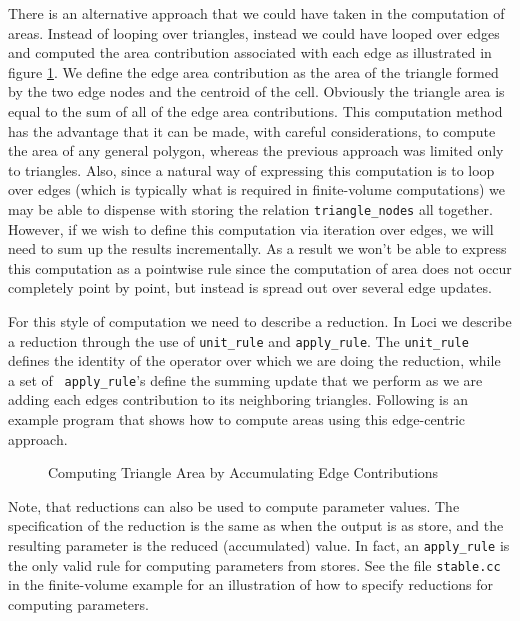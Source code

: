 \documentclass[10pt,epsf]{book}
\begin{document}
There is an alternative approach that we could have taken in the
computation of areas.  Instead of looping over triangles, instead we
could have looped over edges and computed the area contribution
associated with each edge as illustrated in figure \ref{fig:area}.  We
define the edge area contribution as the area of the triangle formed
by the two edge nodes and the centroid of the cell.  Obviously the
triangle area is equal to the sum of all of the edge area
contributions.  This computation method has the advantage that it can
be made, with careful considerations, to compute the area of any
general polygon, whereas the previous approach was limited only to
triangles.  Also, since a natural way of expressing this computation
is to loop over edges (which is typically what is required in
finite-volume computations) we may be able to dispense with storing
the relation {\tt triangle\_nodes} all together.  However, if we wish
to define this computation via iteration over edges, we will need to
sum up the results incrementally.  As a result we won't be able to
express this computation as a pointwise rule since the computation
of area does not occur completely point by point, but instead is
spread out over several edge updates.  

For this style of computation we need to describe a reduction.  In
Loci we describe a reduction through the use of {\tt unit\_rule} and
{\tt apply\_rule}.  The {\tt unit\_rule} defines the identity of the
operator over which we are doing the reduction, while a set of {\tt
  apply\_rule}'s define the summing update that we perform as we are
adding each edges contribution to its neighboring triangles.
Following is an example program that shows how to compute areas using
this edge-centric approach.

\begin{figure}[h]
\centerline{
\epsfxsize=3.2in
}
\caption{Computing Triangle Area by Accumulating Edge Contributions}
\label{fig:area}
\end{figure}

Note, that reductions can also be used to compute parameter values.
The specification of the reduction is the same as when the output is
as store, and the resulting parameter is the reduced (accumulated)
value.  In fact, an {\tt apply\_rule} is the only valid rule for
computing parameters from stores.  See the file {\tt stable.cc} in the
finite-volume example for an illustration of how to specify reductions
for computing parameters.
\end{document}
